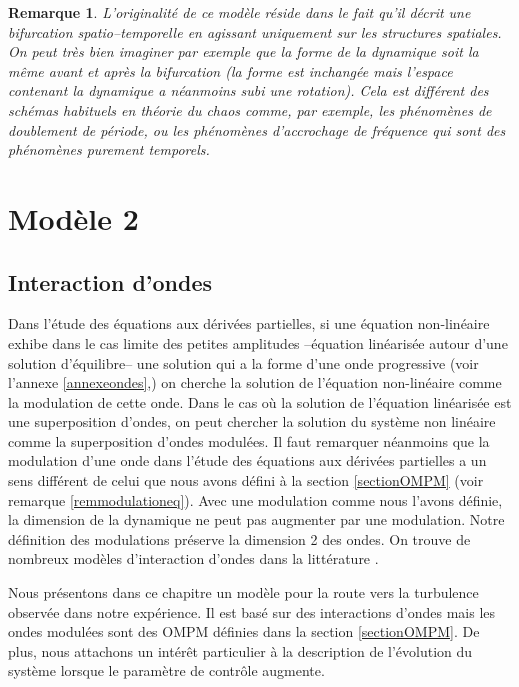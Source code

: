 \documentclass{book}
\newtheorem{rem}{Remarque}[chapter]
\begin{document}
\begin{rem}
L'originalit\'e de ce mod\`ele r\'eside dans le fait qu'il d\'ecrit une
bifurcation spatio--temporelle en agissant uniquement sur les structures
spatiales.
On peut tr\`es bien imaginer par exemple que la forme de la dynamique
soit la m\^eme avant et apr\`es la bifurcation (la forme est inchang\'ee
mais l'espace contenant la dynamique a n\'eanmoins subi une rotation).
Cela est diff\'erent des sch\'emas habituels en th\'eorie du chaos comme,
par exemple, les ph\'enom\`enes de doublement de p\'eriode, ou les
ph\'enom\`enes 
d'accrochage de fr\'equence qui sont des ph\'enom\`enes purement
temporels. 
\end{rem}


\chapter{Mod\`ele 2}\label{chapmodele2}
\section{Interaction d'ondes}

Dans l'\'etude des \'equations aux d\'eriv\'ees partielles, si
une \'equation non-lin\'eaire exhibe dans le cas limite des petites
amplitudes --\'equation lin\'earis\'ee autour d'une solution
d'\'equilibre-- une solution qui a la forme d'une onde progressive
(voir l'annexe \ref{annexeondes},) on cherche la solution de
l'\'equation non-lin\'eaire comme la modulation de cette onde.
Dans le cas o\`u la solution de l'\'equation lin\'earis\'ee est une
superposition d'ondes, on peut chercher la solution du syst\`eme non
lin\'eaire comme la superposition d'ondes modul\'ees.
Il faut remarquer n\'eanmoins que  la modulation d'une onde  dans
l'\'etude des 
\'equations aux d\'eriv\'ees partielles a un sens diff\'erent de celui
que nous avons d\'efini \`a la section \ref{sectionOMPM} (voir remarque
\ref{remmodulationeq}). Avec une modulation comme nous l'avons
d\'efinie, la dimension de la dynamique ne peut pas augmenter par une
modulation. 
Notre d\'efinition des modulations pr\'eserve la dimension 2 des ondes.
On trouve de nombreux mod\`eles d'interaction d'ondes dans la
litt\'erature \cite{Craik85,Bers75,Kaup79,Chow92,Chow95}.



Nous pr\'esentons dans ce chapitre un mod\`ele pour la route vers la
turbulence observ\'ee dans notre exp\'erience. Il est bas\'e sur des
interactions d'ondes mais les ondes modul\'ees sont des OMPM d\'efinies
dans la section \ref{sectionOMPM}. De plus, nous attachons un int\'er\^et
particulier \`a la description de l'\'evolution du syst\`eme lorsque
le param\`etre de contr\^ole augmente.
\end{document}
